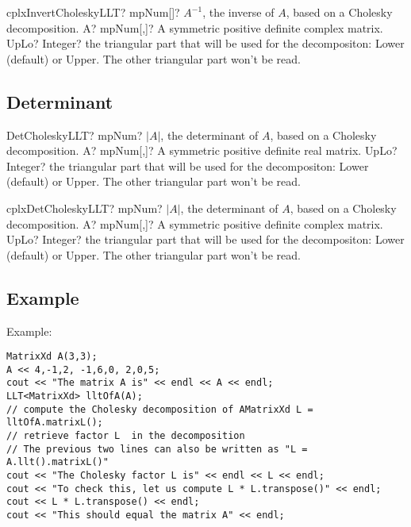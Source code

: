 \vspace{0.6cm}
\begin{mpFunctionsExtract}
	\mpFunctionTwo
	{cplxInvertCholeskyLLT? mpNum[]? $A^{-1}$, the inverse of $A$, based on a Cholesky decomposition.}
	{A? mpNum[,]? A symmetric positive definite complex matrix.}
	{UpLo? Integer? the triangular part that will be used for the decompositon: Lower (default) or Upper. The other triangular part won't be read.}
\end{mpFunctionsExtract}




\subsection{Determinant}

\begin{mpFunctionsExtract}
	\mpFunctionTwo
	{DetCholeskyLLT? mpNum? $|A|$, the determinant of $A$, based on a Cholesky decomposition.}
	{A? mpNum[,]? A symmetric positive definite real matrix.}
	{UpLo? Integer? the triangular part that will be used for the decompositon: Lower (default) or Upper. The other triangular part won't be read.}
\end{mpFunctionsExtract}


\vspace{0.6cm}
\begin{mpFunctionsExtract}
	\mpFunctionTwo
	{cplxDetCholeskyLLT? mpNum? $|A|$, the determinant of $A$, based on a Cholesky decomposition.}
	{A? mpNum[,]? A symmetric positive definite complex matrix.}
	{UpLo? Integer? the triangular part that will be used for the decompositon: Lower (default) or Upper. The other triangular part won't be read.}
\end{mpFunctionsExtract}




\subsection{Example}
Example:

\begin{lstlisting}
MatrixXd A(3,3);
A << 4,-1,2, -1,6,0, 2,0,5;
cout << "The matrix A is" << endl << A << endl;
LLT<MatrixXd> lltOfA(A);
// compute the Cholesky decomposition of AMatrixXd L = lltOfA.matrixL();
// retrieve factor L  in the decomposition
// The previous two lines can also be written as "L = A.llt().matrixL()"
cout << "The Cholesky factor L is" << endl << L << endl;
cout << "To check this, let us compute L * L.transpose()" << endl;
cout << L * L.transpose() << endl;
cout << "This should equal the matrix A" << endl;
\end{lstlisting}

